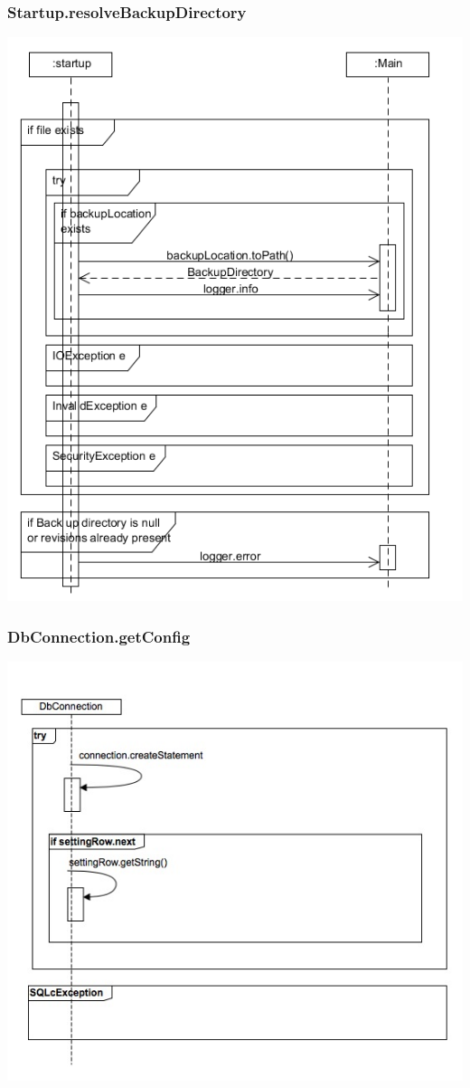 \documentclass[12pt,a4paper]{article}
\begin{document}
\subsubsection{Startup.resolveBackupDirectory}
\includegraphics[width=\textwidth]{images/resolveBackupDirectory.png}

\subsubsection{DbConnection.getConfig}
\includegraphics[width=\textwidth]{images/dbconnection_getconfig.jpg}
\end{document}
